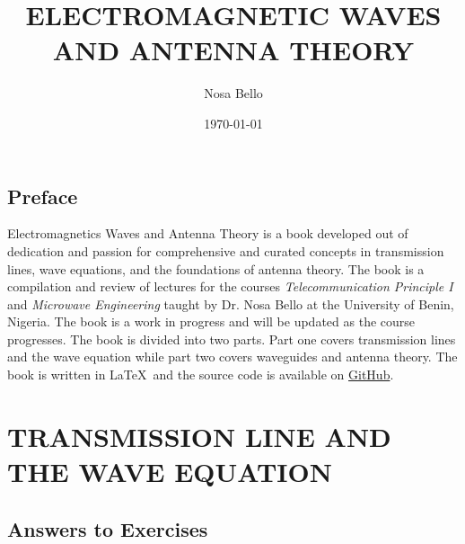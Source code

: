 \documentclass[a4paper,10pt, twocolumn]{book}
\begin{document}
\author{Nosa Bello}
\title{\color{blue}ELECTROMAGNETIC WAVES AND ANTENNA THEORY}
\date{\today}

\frontmatter
\maketitle
\tableofcontents

\chapter{Preface}
Electromagnetics Waves and Antenna Theory is a book developed out of dedication and passion for comprehensive and curated concepts in transmission lines, wave equations, and the foundations of antenna theory. The book is a compilation and review of lectures for the courses \textit{Telecommunication Principle I} and \textit{Microwave Engineering} taught by Dr. Nosa Bello at the University of Benin, Nigeria. The book is a work in progress and will be updated as the course progresses. The book is divided into two parts. Part one covers transmission lines and the wave equation while part two covers waveguides and antenna theory. The book is written in \LaTeX\ and the source code is available on \href{https://github.com/allisonoge/electromagnetism-and-antenna-theory-v2.git}{GitHub}.

\mainmatter

\part{TRANSMISSION LINE AND THE WAVE EQUATION}


% 
% 
% 
% 
% 
% 
% 
% 
% 
% 
% 
% 
% 



% 
% 

% 
% 
% 
% 
% 
% 
% 
% 
% 
% 
% 
% 
% 
% 
% 
% 
% 

\backmatter
\printindex

\appendix

\chapter*{Answers to Exercises}
\shipoutAnswer
\end{document}
